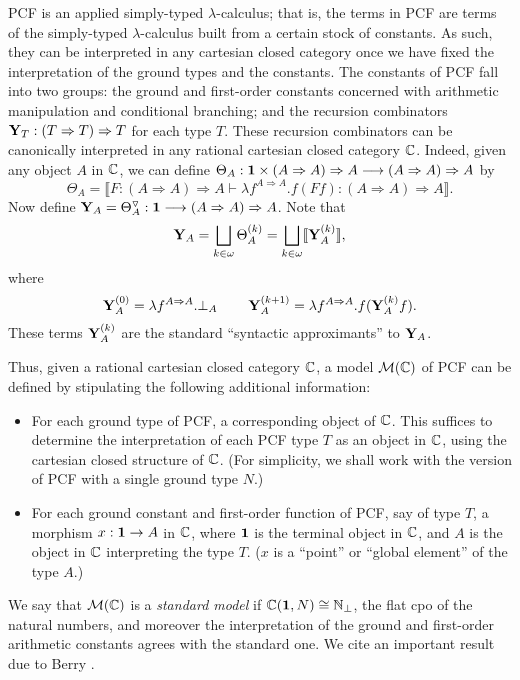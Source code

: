 \documentclass[11pt]{article}
\newcommand{\rat}{\triangledown}
\newcommand{\Mod}{{\cal M}}
\begin{document}
PCF is an applied simply-typed $\lambda$-calculus; that is, the terms in PCF are
terms of the simply-typed $\lambda$-calculus built from a certain
stock of constants.
As such, they can be interpreted in any cartesian closed category once we have
fixed the interpretation of the ground types and the constants.
The constants of PCF fall into two groups: the ground and first-order constants
concerned with arithmetic manipulation and conditional branching;
and the recursion combinators
${\bf Y}_{T} : (T \Rightarrow T) \Rightarrow T$  for each type $T$.
These recursion combinators can be canonically interpreted in any rational
cartesian closed category ${\Bbb C}$.
Indeed, given any object $A$ in ${\Bbb C}$, we can define
$\Theta_{A} : {\bf 1} \times (A \Rightarrow A) \Rightarrow A \longrightarrow
(A \Rightarrow A) \Rightarrow A$
by
\[ \Theta_{A} = \llbracket F : (A \Rightarrow A) \Rightarrow A \vdash
\lambda f^{A \Rightarrow A}. f(F f) : (A \Rightarrow A) \Rightarrow A
\rrbracket . \]
Now define ${\bf Y}_{A} = \Theta_{A}^{\rat} : {\bf 1} \longrightarrow (A \Rightarrow
A) \Rightarrow A$.
Note that
\[ {\bf Y}_{A} = \bigsqcup_{k \in \omega} \Theta_{A}^{(k)} =
\bigsqcup_{k \in \omega} \llbracket {\bf Y}_{A}^{(k)} \rrbracket , \]
where
\[ {\bf Y}_{A}^{(0)} = \lambda f^{A \Rightarrow A}. \bot_{A} \;\;\;\;\;\;\;\;
{\bf Y}_{A}^{(k + 1)} = \lambda f^{A \Rightarrow A}. f({\bf Y}_{A}^{(k)} f) . \]
These terms ${\bf Y}_{A}^{(k)}$ are the standard ``syntactic approximants''
to ${\bf Y}_{A}$.


Thus, given a rational cartesian closed category ${\Bbb C}$, a model
$\Mod ({\Bbb C})$
of PCF can be defined by stipulating the following additional information:
\begin{itemize}
\item For each ground type of PCF, a corresponding object
of ${\Bbb C}$. This suffices to determine the interpretation of each
PCF type $T$ as an object in ${\Bbb C}$, using the cartesian closed structure
of ${\Bbb C}$.
(For simplicity, we shall work with the version of PCF with a single ground
type $N$.)
\item For each ground constant  and first-order function of PCF,
say of type $T$,
a morphism $x : {\bf 1} \rightarrow A$ in ${\Bbb C}$, where ${\bf 1}$
is the terminal object in ${\Bbb C}$, and $A$ is the object in ${\Bbb C}$
interpreting the type $T$. ($x$ is a ``point'' or ``global element'' of the
type $A$.)
\end{itemize}

We say that $\Mod ({\Bbb C})$ is a {\em standard model} if ${\Bbb
C}({\bf 1}, N ) \cong {\Bbb N}_{\bot}$, the flat cpo of the
natural numbers, and moreover the interpretation of the ground and
first-order arithmetic constants agrees with the standard one. We
cite an important result due to Berry
\cite{BerryG:modcom,BerryG:fulasl}.
\end{document}
